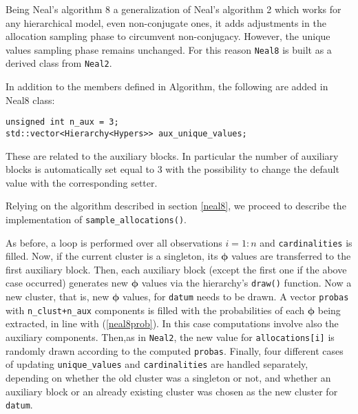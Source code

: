 Being Neal's algorithm 8 a generalization of Neal's algorithm 2 which works for any hierarchical model, even non-conjugate ones, it adds adjustments in the allocation sampling phase to circumvent non-conjugacy.
However, the unique values sampling phase remains unchanged. For this reason \verb|Neal8| is built as a derived class from \verb|Neal2|.

In addition to the members defined in Algorithm, the following are added in Neal8 class:
\begin{verbatim}
unsigned int n_aux = 3;
std::vector<Hierarchy<Hypers>> aux_unique_values;
\end{verbatim}
These are related to the auxiliary blocks. In particular the number of auxiliary blocks is automatically set equal to 3 with the possibility to change the default value with the corresponding setter.

Relying on the algorithm described in section \ref{neal8}, we proceed to describe the implementation of \verb|sample_allocations()|.

As before, a loop is performed over all observations $i=1:n$ and \verb|cardinalities| is filled. Now, if the current cluster is a singleton, its $\boldsymbol\phi$ values are transferred to the first auxiliary block. Then, each auxiliary block (except the first one if the above case occurred) generates new $\boldsymbol\phi$ values via the hierarchy's \verb|draw()| function. Now a new cluster, that is, new $\boldsymbol\phi$ values, for \verb|datum| needs to be drawn. 	A vector \verb|probas| with \verb|n_clust+n_aux| components is filled with the probabilities of each $\boldsymbol\phi$ being extracted, in line with (\ref{neal8prob}). In this case computations involve also the auxiliary components. Then,as in \verb|Neal2|, the new value for \verb|allocations[i]| is randomly drawn according to the computed \verb|probas|. Finally, four different cases of updating \verb|unique_values| and \verb|cardinalities| are handled separately, depending on whether the old cluster was a singleton or not, and whether an auxiliary block or an already existing cluster was chosen as the new cluster for \verb|datum|.
